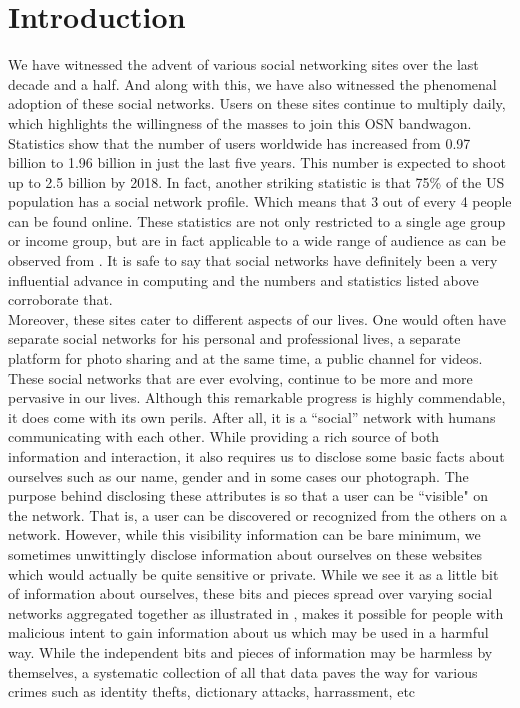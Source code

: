 \documentclass[10pt,conference]{IEEEtran}
\begin{document}
\section{Introduction}
We have witnessed the advent of various social networking sites over the last decade and a half. And along with this, we have also witnessed the phenomenal adoption of these social networks. Users on these sites continue to multiply daily, which highlights the willingness of the masses to join this OSN bandwagon. Statistics show\cite{statswebsite} that the number of users worldwide has increased from 0.97 billion to 1.96 billion in just the last five years. This number is expected to shoot up to 2.5 billion by 2018. In fact, another striking statistic is that 75\% of the US population has a social network profile. Which means that 3 out of every 4 people can be found online. These statistics are not only restricted to a single age group or income group, but are in fact applicable to a wide range of audience as can be observed from \cite{secondstat}. It is safe to say that social networks have definitely been a very influential advance in computing and the numbers and statistics listed above corroborate that.\\

Moreover, these sites cater to different aspects of our lives. One would often have separate social networks for his personal and professional lives, a separate platform for photo sharing and at the same time, a public channel for videos. These social networks that are ever evolving, continue to be more and more pervasive in our lives. Although this remarkable progress is highly commendable, it does come with its own perils. After all, it is a ``social'' network with humans communicating with each other. While providing a rich source of both information and interaction, it also requires us to disclose some basic facts about ourselves such as our name, gender and in some cases our photograph. The purpose behind disclosing these attributes is so that a user can be ``visible" on the network. That is, a user can be discovered or recognized from the others on a network. However, while this visibility information can be bare minimum, we sometimes unwittingly disclose information about ourselves on these websites which would actually be quite sensitive or private. While we see it as a little bit of information about ourselves, these bits and pieces spread over varying social networks aggregated together as illustrated in \cite{privacypaper}, makes it possible for people with malicious intent to gain information about us which may be used in a harmful way. While the independent bits and pieces of information may be harmless by themselves, a systematic collection of all that data paves the way for various crimes such as identity thefts, dictionary attacks, harrassment, etc\\
\end{document}
